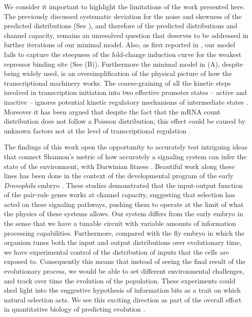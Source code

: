 We consider it important to highlight the limitations of the work presented
here. The previously discussed systematic deviation for the noise and skewness
of the predicted distributions (See ), and therefore of
the predicted distributions and channel capacity, remains an unresolved question
that deserves to be addressed in further iterations of our minimal model. Also,
as first reported in \cite{Razo-Mejia2018}, our model fails to capture the
steepness of the fold-change induction curve for the weakest repressor binding
site (See (B)). Furthermore the minimal model in
(A), despite being widely used, is an
oversimplification of the physical picture of how the transcriptional machinery
works. The coarse-graining of all the kinetic steps involved in transcription
initiation into two effective promoter states -- active and inactive -- ignores
potential kinetic regulatory mechanisms of intermediate states
\cite{Scholes2017}. Moreover it has been argued that despite the fact that the
mRNA count distribution does not follow a Poisson distribution, this effect
could be caused by unknown factors not at the level of transcriptional
regulation \cite{Choubey2018}.

The findings of this work open the opportunity to accurately test intriguing
ideas that connect Shannon's metric of how accurately a signaling system can
infer the state of the environment, with Darwinian fitness \cite{Taylor2007}.
Beautiful work along these lines has been done in the context of the
developmental program of the early {\it Drosophila} embryo \cite{Tkacik2008,
Petkova2019}. These studies demonstrated that the input-output function of the
pair-rule genes works at channel capacity, suggesting that selection has acted
on these signaling pathways, pushing them to operate at the limit of what the
physics of these systems allows. Our system differs from the early embryo in
the sense that we have a tunable circuit with variable amounts of information
processing capabilities. Furthermore, compared with the fly embryo in which the
organism tunes both the input and output distributions over evolutionary time,
we have experimental control of the distribution of inputs that the cells are
exposed to. Consequently this means that instead of seeing the final result of
the evolutionary process, we would be able to set different environmental
challenges, and track over time the evolution of the population. These
experiments could shed light into the suggestive hypothesis of information bits
as a trait on which natural selection acts. We see this exciting direction as
part of the overall effort in quantitative biology of predicting evolution
\cite{Lassig2017}.